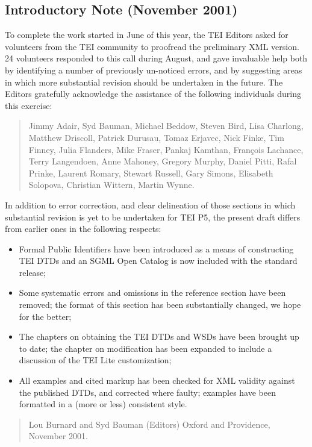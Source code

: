 \subsection[{Introductory Note (November 2001)}]{Introductory Note (November 2001)}\label{p4pf01}\par
To complete the work started in June of this year, the TEI Editors asked for volunteers from the TEI community to proofread the preliminary XML version. 24 volunteers responded to this call during August, and gave invaluable help both by identifying a number of previously un-noticed errors, and by suggesting areas in which more substantial revision should be undertaken in the future. The Editors gratefully acknowledge the assistance of the following individuals during this exercise: 
\begin{quote}
Jimmy Adair, Syd Bauman, Michael Beddow, Steven Bird, Lisa Charlong, Matthew Driscoll, Patrick Durusau, Tomaz Erjavec, Nick Finke, Tim Finney, Julia Flanders, Mike Fraser, Pankaj Kamthan, François Lachance, Terry Langendoen, Anne Mahoney, Gregory Murphy, Daniel Pitti, Rafal Prinke, Laurent Romary, Stewart Russell, Gary Simons, Elisabeth Solopova, Christian Wittern, Martin Wynne.\end{quote}
\par
In addition to error correction, and clear delineation of those sections in which substantial revision is yet to be undertaken for TEI P5, the present draft differs from earlier ones in the following respects: \begin{itemize}
\item Formal Public Identifiers have been introduced as a means of constructing TEI DTDs and an SGML Open Catalog is now included with the standard release; 
\item Some systematic errors and omissions in the reference section have been removed; the format of this section has been substantially changed, we hope for the better;
\item The chapters on obtaining the TEI DTDs and WSDs have been brought up to date; the chapter on modification has been expanded to include a discussion of the TEI Lite customization;
\item All examples and cited markup has been checked for XML validity against the published DTDs, and corrected where faulty; examples have been formatted in a (more or less) consistent style.
\end{itemize} 

\begin{quote}
Lou Burnard and Syd Bauman (Editors)\mbox{}\newline 
 Oxford and Providence, November 2001.\end{quote}

